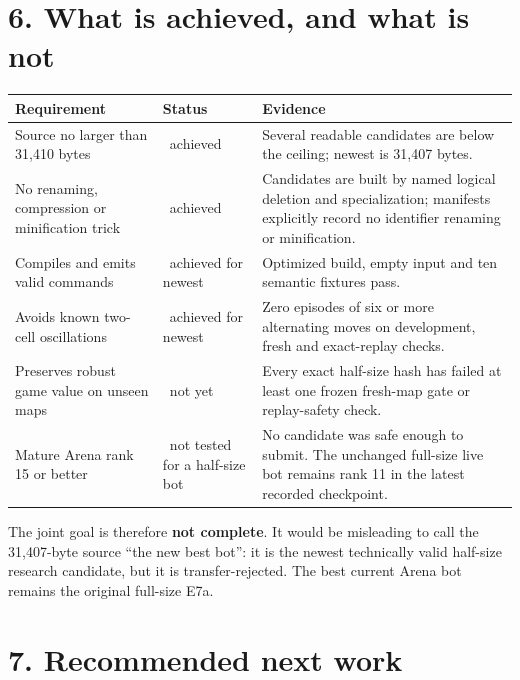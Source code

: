 \documentclass[10pt,a4paper]{article}
\newcommand{\yes}{\textcolor{good}{\ding{51}}}
\newcommand{\no}{\textcolor{bad}{\ding{55}}}
\begin{document}
\section*{6. What is achieved, and what is not}

\begin{tabularx}{\textwidth}{@{}p{52mm}p{20mm}Y@{}}
\toprule
\textbf{Requirement} & \textbf{Status} & \textbf{Evidence} \\
\midrule
Source no larger than 31,410 bytes & \yes\ achieved & Several readable candidates are below the ceiling; newest is 31,407 bytes. \\
No renaming, compression or minification trick & \yes\ achieved & Candidates are built by named logical deletion and specialization; manifests explicitly record no identifier renaming or minification. \\
Compiles and emits valid commands & \yes\ achieved for newest & Optimized build, empty input and ten semantic fixtures pass. \\
Avoids known two-cell oscillations & \yes\ achieved for newest & Zero episodes of six or more alternating moves on development, fresh and exact-replay checks. \\
Preserves robust game value on unseen maps & \no\ not yet & Every exact half-size hash has failed at least one frozen fresh-map gate or replay-safety check. \\
Mature Arena rank 15 or better & \no\ not tested for a half-size bot & No candidate was safe enough to submit. The unchanged full-size live bot remains rank 11 in the latest recorded checkpoint. \\
\bottomrule
\end{tabularx}

The joint goal is therefore \textbf{not complete}. It would be misleading to call the 31,407-byte
source ``the new best bot'': it is the newest technically valid half-size research candidate,
but it is transfer-rejected. The best current Arena bot remains the original full-size E7a.

\section*{7. Recommended next work}
\end{document}
